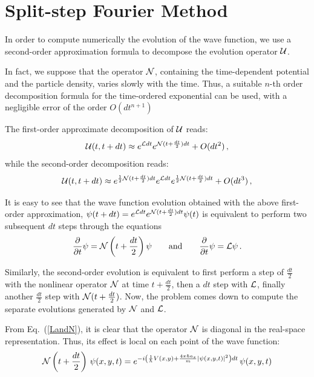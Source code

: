 \documentclass[a4paper,11pt]{article}
\begin{document}
\section{Split-step Fourier Method}

In order to compute numerically the evolution of the wave function, we use a second-order
approximation formula to decompose the evolution operator ${\cal U}$.

In fact, we suppose that the operator ${\cal N}$, containing the
time-dependent potential and the particle density, varies slowly with the time.
Thus, a suitable $n$-th order decomposition formula for the time-ordered exponential
can be used\cite{suzukiPJA93,weidemanSIAM86}, with a negligible error of the order $O(dt^{n+1})$

The first-order approximate decomposition of ${\cal U}$ reads:
\begin{equation}
{\cal U}(t,t+dt) \approx e^{{\cal L}dt} e^{{\cal N}(t+\frac{dt}{2})dt} + O(dt^2) \, ,
\end{equation}
while the second-order decomposition reads:
\begin{equation}
{\cal U}(t,t+dt) \approx e^{\frac{1}{2}{\cal N}(t+\frac{dt}{2})dt}
e^{{\cal L}dt} e^{\frac{1}{2}{\cal N}(t+\frac{dt}{2})dt} + O(dt^3) \, ,
\end{equation}


It is easy to see that the wave function evolution obtained
with the above first-order approximation,
$\psi(t+dt) = e^{{\cal L}dt}e^{{\cal N}(t+\frac{dt}{2})dt}\psi(t)$
is equivalent to perform two subsequent $dt$ steps through the equations
\begin{equation} \label{NLpde}
\frac{\partial}{\partial t} \psi = {\cal N}\left(t+\frac{dt}{2}\right) \psi
\qquad \mbox{and} \qquad
\frac{\partial}{\partial t} \psi = {\cal L} \psi \, .
\end{equation}

Similarly, the second-order evolution is equivalent to first perform
a step of $\frac{dt}{2}$ with the nonlinear operator ${\cal N}$ at time $t+\frac{dt}{2}$,
then a $dt$ step with
$\cal L$, finally another $\frac{dt}{2}$ step with ${\cal N}(t+\frac{dt}{2})$.
Now, the problem comes down to compute the separate evolutions generated by ${\cal N}$ and ${\cal L}$.

From Eq.~(\ref{LandN}), it is clear that the operator ${\cal N}$ is diagonal
in the real-space representation. Thus, its effect is local on each point
of the wave function:
\begin{equation}
{\cal N}\left(t+\frac{dt}{2}\right) \, \psi(x, y, t) =
e^{-i \left(\frac{1}{\hbar}V(x,y) + \frac{4 \pi \hbar a_s}{m} |\psi(x,y,t)|^2 \right) dt} \,
\psi(x, y, t) 
\end{equation}
\end{document}
